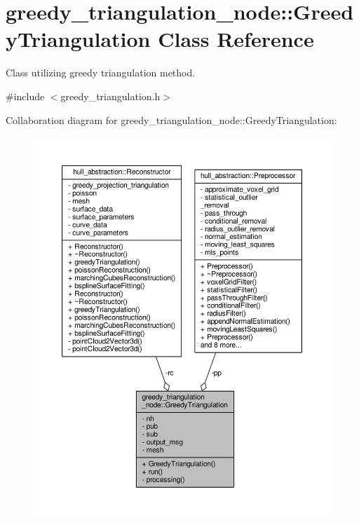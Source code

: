 \hypertarget{classgreedy__triangulation__node_1_1_greedy_triangulation}{}\section{greedy\+\_\+triangulation\+\_\+node\+:\+:Greedy\+Triangulation Class Reference}
\label{classgreedy__triangulation__node_1_1_greedy_triangulation}


Class utilizing greedy triangulation method.  




{\ttfamily \#include $<$greedy\+\_\+triangulation.\+h$>$}



Collaboration diagram for greedy\+\_\+triangulation\+\_\+node\+:\+:Greedy\+Triangulation\+:\nopagebreak
\begin{figure}[H]
\begin{center}
\leavevmode
\includegraphics[width=350pt]{classgreedy__triangulation__node_1_1_greedy_triangulation__coll__graph}
\end{center}
\end{figure}

